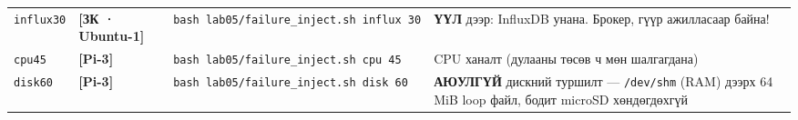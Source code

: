 \begin{longtable}[]{@{}llll@{}}
\begin{minipage}[t]{0.22\columnwidth}\raggedright
\texttt{influx30}\strut
\end{minipage} & \begin{minipage}[t]{0.22\columnwidth}\raggedright
\textbf{{[}ЗК · Ubuntu-1{]}}\strut
\end{minipage} & \begin{minipage}[t]{0.22\columnwidth}\raggedright
\texttt{bash\ lab05/\allowbreak{}failure\_\allowbreak{}inject.\allowbreak{}sh\ influx\ 30}\strut
\end{minipage} & \begin{minipage}[t]{0.22\columnwidth}\raggedright
\textbf{ҮҮЛ} дээр: InfluxDB унана. Брокер, гүүр ажилласаар байна!\strut
\end{minipage}\tabularnewline
\begin{minipage}[t]{0.22\columnwidth}\raggedright
\texttt{cpu45}\strut
\end{minipage} & \begin{minipage}[t]{0.22\columnwidth}\raggedright
\textbf{{[}Pi-3{]}}\strut
\end{minipage} & \begin{minipage}[t]{0.22\columnwidth}\raggedright
\texttt{bash\ lab05/\allowbreak{}failure\_\allowbreak{}inject.\allowbreak{}sh\ cpu\ 45}\strut
\end{minipage} & \begin{minipage}[t]{0.22\columnwidth}\raggedright
CPU ханалт (дулааны төсөв ч мөн шалгагдана)\strut
\end{minipage}\tabularnewline
\begin{minipage}[t]{0.22\columnwidth}\raggedright
\texttt{disk60}\strut
\end{minipage} & \begin{minipage}[t]{0.22\columnwidth}\raggedright
\textbf{{[}Pi-3{]}}\strut
\end{minipage} & \begin{minipage}[t]{0.22\columnwidth}\raggedright
\texttt{bash\ lab05/\allowbreak{}failure\_\allowbreak{}inject.\allowbreak{}sh\ disk\ 60}\strut
\end{minipage} & \begin{minipage}[t]{0.22\columnwidth}\raggedright
\textbf{АЮУЛГҮЙ} дискний туршилт --- \texttt{/dev/shm} (RAM) дээрх 64 MiB loop файл, бодит microSD хөндөгдөхгүй\strut
\end{minipage}\tabularnewline
\bottomrule
\end{longtable}\endgroup

